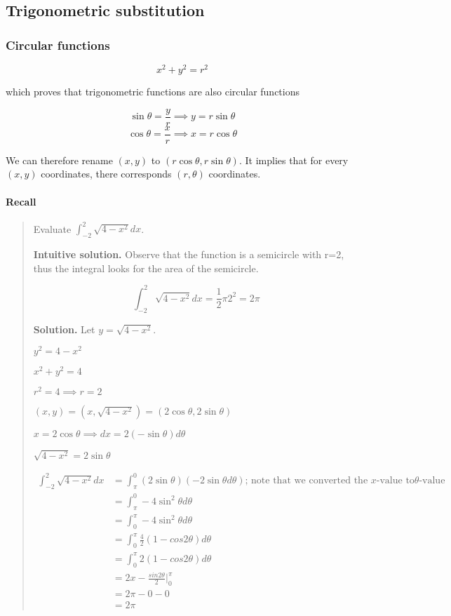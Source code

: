 \documentclass[
]{article}
\begin{document}
\hypertarget{trigonometric-substitution}{%
\subsection{Trigonometric
substitution}\label{trigonometric-substitution}}

\hypertarget{circular-functions}{%
\subsubsection{Circular functions}\label{circular-functions}}

\[ x^2 + y^2 = r^2 \]

which proves that trigonometric functions are also circular functions

\[\sin \theta = \frac{y}{r} \implies y = r\sin \theta\]
\[\cos \theta = \frac{x}{r} \implies x = r\cos \theta\]

We can therefore rename \((x,y)\) to \((r\cos \theta, r\sin \theta)\).
It implies that for every \((x,y)\) coordinates, there corresponds
\((r, \theta)\) coordinates.

\hypertarget{recall}{%
\paragraph*{Recall}\label{recall}}

\begin{quote}
Evaluate \(\displaystyle \int_{-2}^{2} \sqrt{4-x^2}dx\).

\textbf{Intuitive solution.} Observe that the function is a semicircle
with r=2, thus the integral looks for the area of the semicircle.

\[ \int_{-2}^{2} \sqrt{4-x^2}dx = \frac{1}{2}\pi2^2 = 2\pi\]

\textbf{Solution.} Let \(y = \sqrt{4-x^2}\).

\(y^2 = 4-x^2\)

\(x^2 + y^2 = 4\)

\(r^2 = 4 \implies r = 2\)

\((x,y) = (x,\sqrt{4-x^2}) = (2\cos \theta, 2\sin \theta)\)

\(x = 2 \cos \theta \implies dx = 2(-\sin \theta)d\theta\)

\(\sqrt{4-x^2} = 2 \sin \theta\)

\begin{align*}
\int_{-2}^{2} \sqrt{4-x^2}dx &= \int_{\pi}^0(2\sin \theta)(-2\sin\theta d\theta) \text{; note that we converted the } x \text{-value to} \theta \text{-value}\\
&= \int_{\pi}^0 -4\sin^2 \theta d\theta\\
&= \int_0^{\pi} -4\sin^2 \theta d\theta\\
&= \int_0^{\pi} \frac{4}{2}(1-cos 2\theta) d\theta\\
&= \int_0^{\pi} 2(1-cos 2\theta) d\theta\\
&= 2x - \frac{sin 2\theta}{2} \Bigg|_0^{\pi}\\
&= 2\pi - 0 - 0\\
&= 2\pi
\end{align*}
\end{quote}
\end{document}
